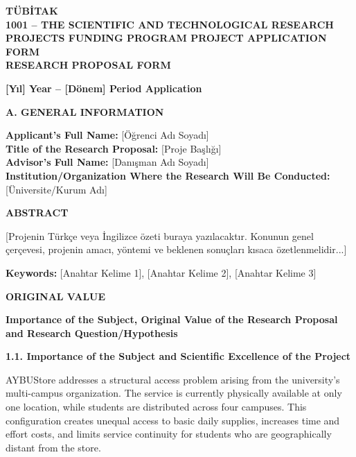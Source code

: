 \documentclass[10pt,a4paper]{article}
\newcommand{\sectionlabel}[1]{\vspace{1.2em}\noindent\textbf{\fontsize{10.5}{12}\selectfont #1}\par\vspace{0.4em}}
\newcommand{\subhead}[1]{\vspace{0.8em}\noindent\textbf{\fontsize{10}{11}\selectfont #1}\par\vspace{0.3em}}
\begin{document}
\thispagestyle{firstpage}

\vspace*{3cm}
\begin{center}
    \textbf{\Huge TÜBİTAK}\\[2.5cm]
    {\Large\bfseries 1001 – THE SCIENTIFIC AND TECHNOLOGICAL RESEARCH PROJECTS FUNDING 
PROGRAM 
PROJECT APPLICATION FORM}\\[1.5cm]
    {\large\bfseries RESEARCH PROPOSAL FORM}\\[2.5cm]
\end{center}
\vfill
\begin{flushright}
    \textbf{[Yıl] Year -- [Dönem] Period Application}
\end{flushright}

\clearpage


\sectionlabel{A. GENERAL INFORMATION}
\begin{tcolorbox}
\textbf{Applicant's Full Name:} [Öğrenci Adı Soyadı] \\[0.6em]
\textbf{Title of the Research Proposal:} [Proje Başlığı] \\[0.6em]
\textbf{Advisor's Full Name:} [Danışman Adı Soyadı] \\[0.6em]
\textbf{Institution/Organization Where the Research Will Be Conducted:} [Üniversite/Kurum Adı]
\end{tcolorbox}

\sectionlabel{ABSTRACT}
\begin{tcolorbox}
{[Projenin Türkçe veya İngilizce özeti buraya yazılacaktır. Konunun genel çerçevesi, projenin amacı, yöntemi ve beklenen sonuçları kısaca özetlenmelidir...]}

\vspace{2em}
\textbf{Keywords:} [Anahtar Kelime 1], [Anahtar Kelime 2], [Anahtar Kelime 3]
\end{tcolorbox}

\sectionlabel{ORIGINAL VALUE}
\subhead{Importance of the Subject, Original Value of the Research Proposal and Research Question/Hypothesis}
\textbf{1.1. Importance of the Subject and Scientific Excellence of the Project}

AYBUStore addresses a structural access problem arising from the university's multi-campus organization. The service is currently physically available at only one location, while students are distributed across four campuses. This configuration creates unequal access to basic daily supplies, increases time and effort costs, and limits service continuity for students who are geographically distant from the store.
\end{document}
